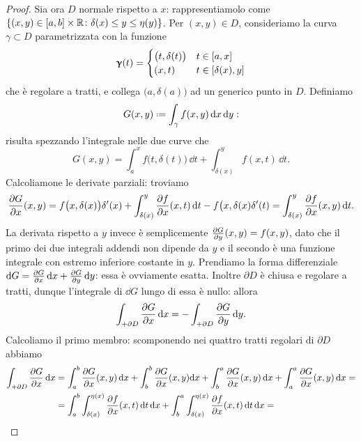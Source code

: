 \begin{proof}
	Sia ora $D$ normale rispetto a $x$: rappresentiamolo come $\{(x,y)\in[a,b]\times\mathbb{R}\colon\delta(x)\leq y\leq\eta(y)\}$.
	Per $(x,y)\in D$, consideriamo la curva $\gamma\subset D$ parametrizzata con la funzione
	\begin{equation*}
		\bm{\upgamma}(t)=
		\begin{cases}
			\big(t,\delta(t)\big) &t\in[a,x]\\
			(x,t) &t\in[\delta(x),y]
		\end{cases}
	\end{equation*}
	che è regolare a tratti, e collega $\big(a,\delta(a)\big)$ ad un generico punto in $D$.
	Definiamo
	\begin{equation*}
		G(x,y)\defeq\int_{\gamma}f(x,y)\,\dd x\,\dd y:
	\end{equation*}
	risulta spezzando l'integrale nelle due curve che
	\begin{equation}
		G(x,y)=\int_a^xf\big(t,\delta(t)\big)\,\dd t+\int_{\delta(x)}^yf(x,t)\,\dd t.
	\end{equation}
	Calcoliamone le derivate parziali: troviamo
	\begin{equation}
		\frac{\partial {G}}{\partial {x}}(x,y)=f\big(x,\delta(x)\big)\delta'(x)+\int_{\delta(x)}^y\frac{\partial {f}}{\partial {x}}(x,t)\,\textup{d} t-f\big(x,\delta(x)\delta'(t)=\int_{\delta(x)}^y\frac{\partial {f}}{\partial {x}}(x,y)\,\textup{d} t.
	\end{equation}
	La derivata rispetto a $y$ invece è semplicemente $\frac{\partial {G}}{\partial {y}}(x,y)=f(x,y)$, dato che il primo dei due integrali addendi non dipende da $y$ e il secondo è una funzione integrale con estremo inferiore costante in $y$.
	Prendiamo la forma differenziale $\textup{d} G=\frac{\partial {G}}{\partial {x}}\,\textup{d} x+\frac{\partial {G}}{\partial {y}}\,\textup{d} y$: essa è ovviamente esatta.
	Inoltre $\partial D$ è chiusa e regolare a tratti, dunque l'integrale di $\dd G$ lungo di essa è nullo: allora
	\begin{equation}
		\int_{+\partial D}\frac{\partial {G}}{\partial {x}}\,\textup{d} x=-\int_{+\partial D}\frac{\partial {G}}{\partial {y}}\,\textup{d} y.
		\label{eq:dim-gauss-green-forma-esatta}
	\end{equation}
	Calcoliamo il primo membro: scomponendo nei quattro tratti regolari di $\partial D$ abbiamo
	\begin{equation}
		\begin{split}
			\int_{+\partial D}\drp{G}{x}\,\dd x&=\int_a^b\drp{G}{x}(x,y)\,\dd x+\int_b^b\drp{G}{x}(x,y)\dd x+\int_b^a\drp{G}{x}(x,y)\,\dd x+\int_a^a\drp{G}{x}(x,y)\,\dd x=\\
			&=\int_a^b\int_{\delta(x)}^{\eta(x)}\drp{f}{x}(x,t)\,\dd t\,\dd x+\int_b^a\int_{\delta(x)}^{\eta(x)}\drp{f}{x}(x,t)\,\dd t\,\dd x=\\

\end{split}
\end{equation}
\end{proof}
